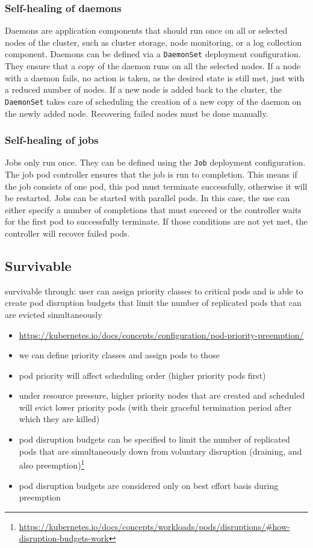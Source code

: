   \subsubsection{Self-healing of daemons}
    Daemons are application components that should run once on all or selected nodes of the cluster, such as cluster storage, node monitoring, or a log collection component.
    Daemons can be defined via a \texttt{DaemonSet} deployment configuration.
    They ensure that a copy of the daemon runs on all the selected nodes.
    If a node with a daemon fails, no action is taken, as the desired state is still met, just with a reduced number of nodes.
    If a new node is added back to the cluster, the \texttt{DaemonSet} takes care of scheduling the creation of a new copy of the daemon on the newly added node.
    Recovering failed nodes must be done manually.

  \subsubsection{Self-healing of jobs}
    Jobs only run once.
    They can be defined using the \texttt{Job} deployment configuration.
    The job \gls{pod controller} ensures that the job is run to completion.
    This means if the job consists of one pod, this pod must terminate successfully, otherwise it will be restarted.
    Jobs can be started with parallel pods.
    In this case, the use can either specify a number of completions that must succeed or the controller waits for the first pod to successfully terminate.
    If those conditions are not yet met, the controller will recover failed pods.

\subsection{Survivable}\label{sec:self-healing-kubernetes:survivable}
  survivable through: user can assign priority classes to critical pods and is able to create pod disruption budgets that limit the number of replicated pods that can are evicted simultaneously
  \begin{itemize}
    \item \url{https://kubernetes.io/docs/concepts/configuration/pod-priority-preemption/}
    \item we can define priority classes and assign pods to those
    \item pod priority will affect scheduling order (higher priority pods first)
    \item under resource pressure, higher priority nodes that are created and scheduled will evict lower priority pods (with their graceful termination period after which they are killed)
    \item pod disruption budgets can be specified to limit the number of replicated pods that are simultaneously down from voluntary disruption (draining, and also preemption)\footnote{\url{https://kubernetes.io/docs/concepts/workloads/pods/disruptions/\#how-disruption-budgets-work}}
    \item pod disruption budgets are considered only on best effort basis during preemption
  \end{itemize}
